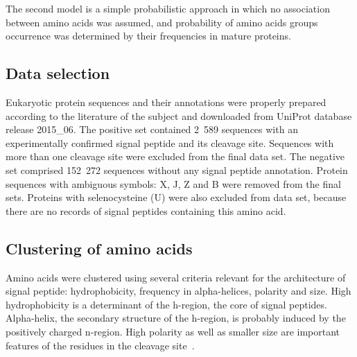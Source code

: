 \documentclass[fleqn,10pt,twoside]{gcb15submission}
\begin{document}
The second model is a simple probabilistic approach in which no association between amino acids was assumed, and probability of amino acids groups occurrence was determined by their frequencies in mature proteins.

\subsection*{Data selection}


Eukaryotic protein sequences and their annotations were properly prepared according to the literature of the subject and downloaded from UniProt database release 2015\_06. The positive set contained 2~589 sequences with an experimentally confirmed signal peptide and its cleavage site. Sequences with more than one cleavage site were excluded from the final data set. The negative set comprised 152~272 sequences without any signal peptide annotation. Protein sequences with ambiguous symbols: X, J, Z and B were removed from the final sets. Proteins with selenocysteine (U) were also excluded from data set, because there are no records of signal peptides containing this amino acid.

\subsection*{Clustering of amino acids}

Amino acids were clustered using several criteria relevant for the architecture of signal peptide: hydrophobicity, frequency in alpha-helices, polarity and size. High hydrophobicity is a determinant of the h-region, the core of signal peptides. Alpha-helix, the secondary structure of the h-region, is probably induced by the positively charged n-region. High polarity as well as smaller size are important features of the residues in the cleavage site~\citep{1994palzkillselection}.
\end{document}
